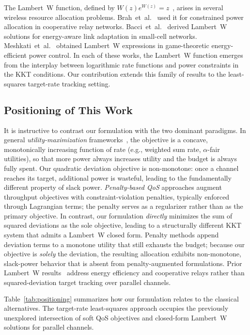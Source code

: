 \documentclass[journal]{IEEEtran}
\begin{document}
The Lambert~W function, defined by $W(z)e^{W(z)} = z$~\cite{corless1996lambertw}, arises in several wireless resource allocation problems.
Brah~et~al.~\cite{brah2011lambertw} used it for constrained power allocation in cooperative relay networks.
Bacci~et~al.~\cite{bacci2014energyaware} derived Lambert~W solutions for energy-aware link adaptation in small-cell networks.
Meshkati~et~al.~\cite{meshkati2006gametheoretic} obtained Lambert~W expressions in game-theoretic energy-efficient power control.
In each of these works, the Lambert~W function emerges from the interplay between logarithmic rate functions and power constraints in the KKT conditions.
Our contribution extends this family of results to the least-squares target-rate tracking setting.

\subsection{Positioning of This Work}

It is instructive to contrast our formulation with the two dominant paradigms.
In general \emph{utility-maximization} frameworks~\cite{kim2010sparecapacity}, the objective is a concave, monotonically increasing function of rate (e.g., weighted sum rate, $\alpha$-fair utilities), so that more power always increases utility and the budget is always fully spent.
Our quadratic deviation objective is non-monotone: once a channel reaches its target, additional power is wasteful, leading to the fundamentally different property of slack power.
\emph{Penalty-based QoS} approaches augment throughput objectives with constraint-violation penalties, typically enforced through Lagrangian terms; the penalty serves as a regularizer rather than as the primary objective.
In contrast, our formulation \emph{directly} minimizes the sum of squared deviations as the sole objective, leading to a structurally different KKT system that admits a Lambert~W closed form.
Penalty methods append deviation terms to a monotone utility that still exhausts the budget; because our objective is \emph{solely} the deviation, the resulting allocation exhibits non-monotone, slack-power behavior that is absent from penalty-augmented formulations.
Prior Lambert~W results~\cite{brah2011lambertw,bacci2014energyaware,meshkati2006gametheoretic} address energy efficiency and cooperative relays rather than squared-deviation target tracking over parallel channels.

Table~\ref{tab:positioning} summarizes how our formulation relates to the classical alternatives.
The target-rate least-squares approach occupies the previously unexplored intersection of soft QoS objectives and closed-form Lambert~W solutions for parallel channels.
\end{document}
